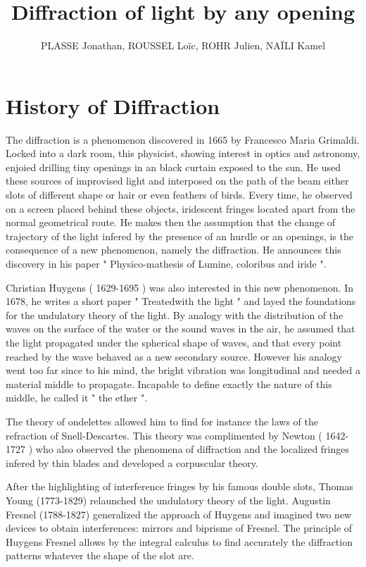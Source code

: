 \documentclass[10pt,a4paper]{article}
\title{Diffraction of light by any opening}
\author{PLASSE Jonathan, ROUSSEL Loïc, ROHR Julien, NAÏLI Kamel}
\begin{document}
\maketitle

\section{History of Diffraction}
The diffraction is a phenomenon discovered in 1665 by Francesco Maria Grimaldi. Locked into a dark room, this physicist, showing interest in optics and astronomy, enjoied drilling tiny openings in an black curtain exposed to the sun. He used these sources of improvised light and interposed on the path of the beam either slots of different shape or hair or even feathers of birds. Every time, he observed on a screen placed behind these objects, iridescent fringes located apart from the normal geometrical route. He makes then the assumption that the change of trajectory of the light infered by the presence of an hurdle or an openings, is the consequence of a new phenomenon, namely the diffraction. He announces this discovery in his paper " Physico-mathesis of Lumine, coloribus and iride ".

Christian Huygens ( 1629-1695 ) was also interested in this new phenomenon. In 1678, he writes a short paper " Treatedwith the light " and layed the foundations for the undulatory theory of the light. By analogy with the distribution of the waves on the surface of the water or the sound waves in the air, he assumed that the light propagated under the spherical shape of waves, and that every point reached by the wave behaved as a new secondary source. However his analogy went too far since to his mind, the bright vibration was longitudinal and needed a material middle to propagate. Incapable to define exactly the nature of this middle, he called it " the ether ". 

The theory of ondelettes allowed him to find for instance the laws of the refraction of Snell-Descartes. This theory was complimented by Newton ( 1642-1727 ) who also observed the phenomena of diffraction and the localized fringes infered by thin blades and developed a corpuscular theory. 

After the highlighting of interference fringes by his famous double slots, Thomas Young (1773-1829) relaunched the undulatory theory of the light. Augustin Fresnel (1788-1827) generalized the approach of Huygens and imagined two new devices to obtain interferences: mirrors and biprisme of Fresnel. The principle of Huygens Fresnel allows by the integral calculus to find accurately the diffraction patterns whatever the shape of the slot are. 
\end{document}
